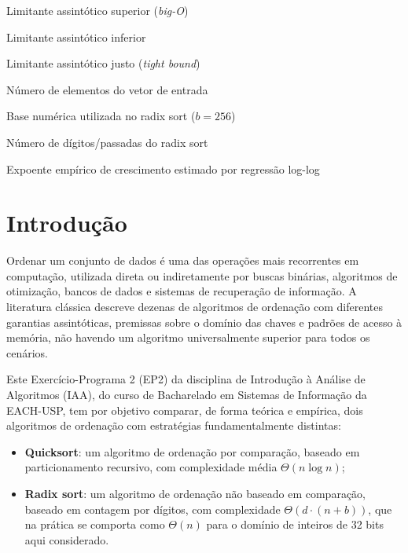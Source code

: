 \documentclass[
	12pt,
	oneside,
	a4paper,
	chapter=TITLE,
	section=TITLE,
	subsection=TITLE,
	subsubsection=TITLE,
	english,
	brazil
]{abntex2}
\theoremstyle{plain}
\theoremstyle{remark}
\renewcommand{\_}{\underscoreoriginal\allowbreak}
\begin{document}
\begin{simbolos}
	\item[$O(\cdot)$] Limitante assintótico superior (\emph{big-O})
	\item[$\Omega(\cdot)$] Limitante assintótico inferior
	\item[$\Theta(\cdot)$] Limitante assintótico justo (\emph{tight bound})
	\item[$n$] Número de elementos do vetor de entrada
	\item[$b$] Base numérica utilizada no radix sort ($b = 256$)
	\item[$d$] Número de dígitos/passadas do radix sort
	\item[$\hat{k}$] Expoente empírico de crescimento estimado por regressão log-log
\end{simbolos}

\tableofcontents*
\cleardoublepage

\textual

\chapter*[Introdução]{Introdução}

Ordenar um conjunto de dados é uma das operações mais recorrentes em computação, utilizada direta ou indiretamente por buscas binárias, algoritmos de otimização, bancos de dados e sistemas de recuperação de informação. A literatura clássica \cite{cormen2009} descreve dezenas de algoritmos de ordenação com diferentes garantias assintóticas, premissas sobre o domínio das chaves e padrões de acesso à memória, não havendo um algoritmo universalmente superior para todos os cenários.

Este Exercício-Programa 2 (EP2) da disciplina de Introdução à Análise de Algoritmos (IAA), do curso de Bacharelado em Sistemas de Informação da EACH-USP, tem por objetivo comparar, de forma teórica e empírica, dois algoritmos de ordenação com estratégias fundamentalmente distintas:

\begin{itemize}
	\item \textbf{Quicksort}: um algoritmo de ordenação por comparação, baseado em particionamento recursivo, com complexidade média $\Theta(n \log n)$;
	\item \textbf{Radix sort}: um algoritmo de ordenação não baseado em comparação, baseado em contagem por dígitos, com complexidade $\Theta(d \cdot (n+b))$, que na prática se comporta como $\Theta(n)$ para o domínio de inteiros de 32 bits aqui considerado.
\end{itemize}
\end{document}
